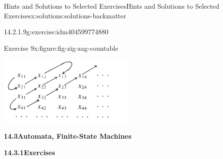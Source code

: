 \documentclass[twoside,10pt,]{book}
\newcommand{\blocktitlefont}{\relax}
\numberwithin{equation}{section}
\begin{document}
\begin{solutions-chapter}{Hints and Solutions to Selected Exercises}{}{Hints and Solutions to Selected Exercises}{}{}{x:solutions:solutions-backmatter}
\begin{divisionsolution}{14.2.1.9}{}{g:exercise:idm404599774880}
\begin{figureptx}{Exercise 9}{x:figure:fig-zig-zag-countable}{}
\begin{image}{0.15}{0.7}{0.15}%
\includegraphics[width=\linewidth]{images/fig-zig-zag-countable.png}
\end{image}%
\tcblower
\end{figureptx}%
\end{divisionsolution}%
\par\smallskip
\noindent\textbf{\Large{}14.3\space\textperiodcentered\space{}Automata, Finite-State Machines}
\par\smallskip
\par\smallskip
\noindent\textbf{\Large{}14.3.1\space\textperiodcentered\space{}Exercises}
\par\smallskip
{}
\end{solutions-chapter}
\end{document}
